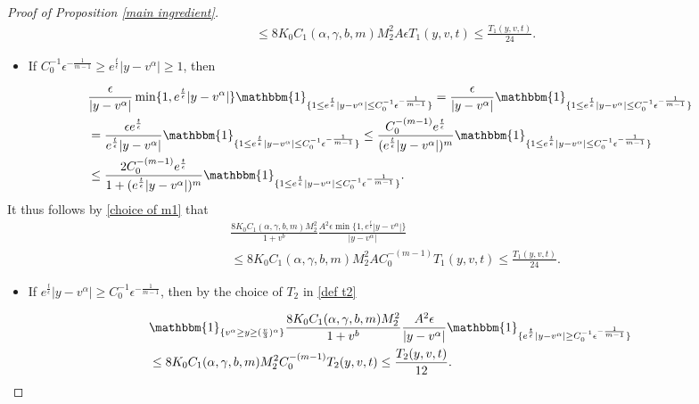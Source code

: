 \documentclass[11pt]{article}
\numberwithin{equation}{section}
\begin{document}
\begin{proof}[Proof of Proposition \ref{main ingredient}]
\begin{align}
  &\leq 8K_{0} C_{1}(\alpha,\gamma,b,m)M_{2}^{2} A\epsilon T_{1}(y,v,t)\leq \frac{T_{1}(y,v,t)}{24}.
\end{align}
\begin{itemize}
    \item If $C_{0}^{-1}\epsilon^{-\frac{1}{m-1}}\geq e^{\frac{t}{\epsilon}}|y-v^{\alpha}|\geq 1$, then 
\end{itemize}
\begin{align}
&\frac{\epsilon}{|y-v^{\alpha}|}\min\{1,e^{\frac{t}{\epsilon}}|y-v^{\alpha}|\}\mathbbm{1}_{\{1\leq e^{\frac{t}{\epsilon}}|y-v^{\alpha}|\leq C_{0}^{-1}\epsilon^{-\frac{1}{m-1}}\}} = \frac{\epsilon}{|y-v^{\alpha}|}\mathbbm{1}_{\{1\leq e^{\frac{t}{\epsilon}}|y-v^{\alpha}|\leq C_{0}^{-1}\epsilon^{-\frac{1}{m-1}}\}}\nonumber\\
&= \frac{\epsilon e^{\frac{t}{\epsilon}}}{e^{\frac{t}{\epsilon}}|y-v^{\alpha}|}\mathbbm{1}_{\{1\leq e^{\frac{t}{\epsilon}}|y-v^{\alpha}|\leq C_{0}^{-1}\epsilon^{-\frac{1}{m-1}}\}}\leq \frac{ C_{0}^{-(m-1)}e^{\frac{t}{\epsilon}}}{(e^{\frac{t}{\epsilon}}|y-v^{\alpha}|)^{m}}\mathbbm{1}_{\{1\leq e^{\frac{t}{\epsilon}}|y-v^{\alpha}|\leq C_{0}^{-1}\epsilon^{-\frac{1}{m-1}}\}}\nonumber\\
&\leq \frac{ 2 C_{0}^{-(m-1)}e^{\frac{t}{\epsilon}}}{1+(e^{\frac{t}{\epsilon}}|y-v^{\alpha}|)^{m}}\mathbbm{1}_{\{1\leq e^{\frac{t}{\epsilon}}|y-v^{\alpha}|\leq C_{0}^{-1}\epsilon^{-\frac{1}{m-1}}\}}.\label{c0 initial mention}
\end{align}
It thus follows by \eqref{choice of m1} that 
\begin{align}
 & \frac{  8K_{0}C_{1}(\alpha,\gamma,b,m)M_{2}^{2}}{1+v^{b}} \frac{A^{2}\epsilon \min\{1,e^{\frac{t}{\epsilon}}|y-v^{\alpha}|\}}{|y-v^{\alpha}|}\nonumber\\
  &\leq 8K_{0}C_{1}(\alpha,\gamma,b,m)M_{2}^{2}A C_{0}^{-(m-1)}T_{1}(y,v,t)\leq \frac{T_{1}(y,v,t)}{24}.\label{e3}
\end{align}
\begin{itemize}
    \item If $e^{\frac{t}{\epsilon}}|y-v^{\alpha}|\geq C_{0}^{-1}\epsilon^{-\frac{1}{m-1}}$, then by the choice of $T_{2}$ in \eqref{def t2}
\end{itemize}
\begin{align}\label{region above dirac constant bound}
&\mathbbm{1}_{\{v^{\alpha}\geq y\geq (\frac{v}{3})^{\alpha}\}} \frac{  8K_{0}C_{1}(\alpha,\gamma,b,m) M_{2}^{2}}{1+v^{b}} \frac{A^{2}\epsilon}{|y-v^{\alpha}|}\mathbbm{1}_{\{ e^{\frac{t}{\epsilon}}|y-v^{\alpha}|\geq C_{0}^{-1}\epsilon^{-\frac{1}{m-1}}\}}\nonumber\\
&\leq  8K_{0}C_{1}(\alpha,\gamma,b,m)M_{2}^{2} C_{0}^{-(m-1)} T_{2}(y,v,t)\leq  \frac{T_{2}(y,v,t)}{12}.
\end{align}


\end{proof}
\end{document}

